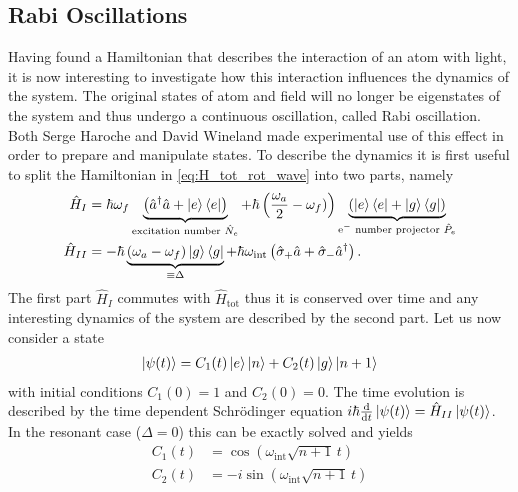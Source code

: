 \subsection{Rabi Oscillations}
Having found a Hamiltonian that describes the interaction of an atom with light,
it is now interesting to investigate how this interaction influences the
dynamics of the system. The original states of atom and field will no longer be
eigenstates of the system and thus undergo a continuous oscillation, called Rabi
oscillation. Both Serge Haroche and David Wineland made experimental use of
this effect in order to prepare and manipulate states. To describe the dynamics
it is first useful to split the Hamiltonian in \eqref{eq:H_tot_rot_wave} into
two parts, namely
\begin{align}
  \label{eq:H_I_H_II}
  \hat{H}_I &= \hbar\omega_f\underbrace{\left( \hat{a}^\dagger\hat{a} +
  \ket{e}\bra{e}\right)}_{\text{excitation number }\hat{N}_e} + \hbar \left( \frac{\omega_a}{2} -
\omega_f)\right)\underbrace{\left(\ket{e}\bra{e} +
\ket{g}\bra{g}\right)}_{\text{e$^-$ number projector }\hat{P}_e} \\
\hat{H}_{II} &= -\hbar \underbrace{\left(\omega_a -
\omega_f\right)\ket{g}\bra{g}}_{\equiv\Delta} +
\hbar\omega_{\text{int}}\left( \hat{\sigma}_+\hat{a} +
  \hat{\sigma}_-\hat{a}^\dagger  \right).
\end{align}
The first part $\hat{H}_I$ commutes with $\hat{H}_{\text{tot}}$ thus it is
conserved over time and any interesting dynamics of the system are described by
the second part. Let us now consider a state
\begin{align}
  \label{eq:psi_t}
  \ket{\psi(t)} = C_1(t)\ket{e}\ket{n} + C_2(t)\ket{g}\ket{n+1} 
\end{align}
with initial conditions $C_1(0) = 1$ and $C_2(0)=0$. The time evolution is
described by the time dependent Schrödinger equation
$i\hbar\frac{\text{d}}{\text{d}t}\ket{\psi(t)}
= \hat{H}_{II}\ket{\psi(t)}$. In the resonant case ($\Delta=0$) this can be
exactly solved and yields
\begin{align}
  \label{eq:psi_t_solution}
  C_1(t) &= \cos\left(\omega_{\text{int}}\sqrt{n+1}\,t\right) \\
  C_2(t) &= -i\sin\left(\omega_\text{int} \sqrt{n+1} \,t\right)
\end{align}

